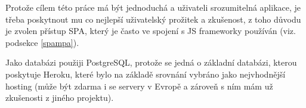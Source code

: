     Protože cílem této práce má být jednoduchá a uživateli srozumitelná aplikace, je třeba poskytnout mu co nejlepší uživatelský prožitek a zkušenost, z toho důvodu je zvolen přístup SPA, který je často ve spojení s JS frameworky používán (viz. podsekce \ref{spampa}).
    
    Jako databázi použiji PostgreSQL, protože se jedná o základní databázi, kterou poskytuje Heroku, které bylo na základě srovnání vybráno jako nejvhodnější hosting (může být zdarma i se servery v Evropě a zároveň s ním mám už zkušenosti z jiného projektu).
